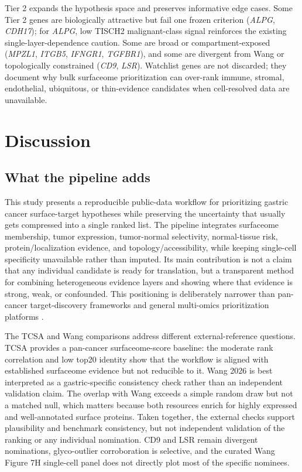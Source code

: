 \documentclass[twocolumn]{article}
\begin{document}
Tier 2 expands the hypothesis space and preserves informative edge cases. Some Tier 2 genes are biologically attractive but fail one frozen criterion (\textit{ALPG}, \textit{CDH17}); for \textit{ALPG}, low TISCH2 malignant-class signal reinforces the existing single-layer-dependence caution. Some are broad or compartment-exposed (\textit{MPZL1}, \textit{ITGB5}, \textit{IFNGR1}, \textit{TGFBR1}), and some are divergent from Wang or topologically constrained (\textit{CD9}, \textit{LSR}). Watchlist genes are not discarded; they document why bulk surfaceome prioritization can over-rank immune, stromal, endothelial, ubiquitous, or thin-evidence candidates when cell-resolved data are unavailable.

\section{Discussion}

\subsection{What the pipeline adds}

This study presents a reproducible public-data workflow for prioritizing gastric cancer surface-target hypotheses while preserving the uncertainty that usually gets compressed into a single ranked list. The pipeline integrates surfaceome membership, tumor expression, tumor-normal selectivity, normal-tissue risk, protein/\allowbreak{}localization evidence, and topology/\allowbreak{}accessibility, while keeping single-cell specificity unavailable rather than imputed. Its main contribution is not a claim that any individual candidate is ready for translation, but a transparent method for combining heterogeneous evidence layers and showing where that evidence is strong, weak, or confounded. This positioning is deliberately narrower than pan-cancer target-discovery frameworks and general multi-omics prioritization platforms \cite{li2022pancancer,razzaghdoust2021adc,kathad2024adc,deng2024multiomics2targets}.

The TCSA and Wang comparisons address different external-reference questions. TCSA provides a pan-cancer surfaceome-score baseline: the moderate rank correlation and low top20 identity show that the workflow is aligned with established surfaceome evidence but not reducible to it. Wang 2026 is best interpreted as a gastric-specific consistency check rather than an independent validation claim. The overlap with Wang exceeds a simple random draw but not a matched null, which matters because both resources enrich for highly expressed and well-annotated surface proteins. Taken together, the external checks support plausibility and benchmark consistency, but not independent validation of the ranking or any individual nomination. CD9 and LSR remain divergent nominations, glyco-outlier corroboration is selective, and the curated Wang Figure 7H single-cell panel does not directly plot most of the specific nominees.
\end{document}
